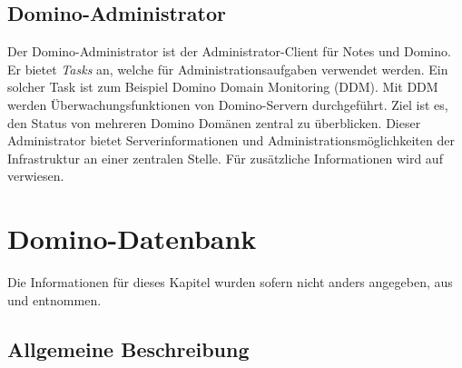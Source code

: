 \vspace{0.1cm}


\subsection{Domino-Administrator}
\label{sec:2allgemein}

Der Domino-Administrator ist der Administrator-Client für Notes und Domino. Er bietet \textit{Tasks} an, welche für Administrationsaufgaben
verwendet werden. Ein solcher Task ist zum Beispiel Domino Domain Monitoring (DDM).
 Mit DDM werden Überwachungsfunktionen von Domino-Servern 
durchgeführt. Ziel ist es, den Status von mehreren Domino Domänen zentral zu überblicken.\newline  
Dieser Administrator bietet Serverinformationen und Administrationsmöglichkeiten der Infrastruktur an einer zentralen Stelle. 
Für zusätzliche Informationen wird auf \cite{ebel} verwiesen.
\vspace{1cm}

\section{Domino-Datenbank}

Die Informationen für dieses Kapitel wurden sofern nicht anders angegeben, aus\cite{ebel} und \cite{knaepper} entnommen.

\subsection{Allgemeine Beschreibung}
\label{sec:3dominoDB}

